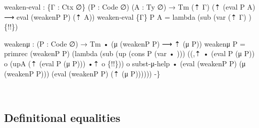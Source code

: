{\begin{code}
{weaken{-}eval : \{Γ : Ctx ∅\} (P : Code ∅) (A : Ty ∅)
  → Tm (⇡ Γ) (⇡ (eval P A) ⟶ eval (weakenP P) (⇡ A))
weaken{-}eval \{Γ\} P A = lambda (sub (var (⇡ Γ) \AgdaUnderscore{}) \{!!\})

weakenμ : (P : Code ∅) → Tm • (μ (weakenP P) ⟶ ⇡ (μ P))
weakenμ P =
  primrec (weakenP P)
          (lambda (sub (up (cons P (var • \AgdaUnderscore{})))
                         ((,⇡ • (eval P (μ P)) o
                           (upA (⇡ (eval P (μ P))) •⇡ o
                           \{!!\})) o
                           subst{-}μ{-}help • (eval (weakenP P) (μ (weakenP P))) (eval (weakenP P) (⇡ (μ P))))))
{-}\}}\<%
\\
\>[0]\AgdaSpace{}%
\AgdaSpace{}%
\AgdaSpace{}%
\<%
\end{code}
}

\subsection{Definitional equalities}
\label{sec:defeq}

